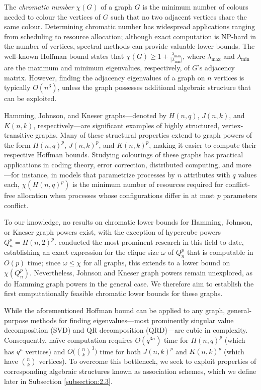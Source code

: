 \documentclass{article}
\numberwithin{equation}{section}
\theoremstyle{plain}
\begin{document}
The \emph{chromatic number} $\chi(G)$ of a graph $G$ is the minimum number of colours needed to colour the vertices of $G$ such that no two adjacent vertices share the same colour. Determining chromatic number has widespread applications ranging from scheduling to resource allocation; although exact computation is NP-hard in the number of vertices, spectral methods can provide valuable lower bounds. The well-known Hoffman bound \cite{Hof03} states that $\chi(G) \ge 1 + \frac{\lambda_{\text{max}}}{\lvert \lambda_{\text{min}} \rvert}$, where $\lambda_{\text{max}}$ and $\lambda_{\text{min}}$ are the maximum and minimum eigenvalues, respectively, of $G$'s adjacency matrix. However, finding the adjacency eigenvalues of a graph on $n$ vertices is typically $O(n^3)$, unless the graph possesses additional algebraic structure that can be exploited.

Hamming, Johnson, and Kneser graphs---denoted by $H(n, q)$, $J(n, k)$, and $K(n, k)$, respectively---are significant examples of highly structured, vertex-transitive graphs. Many of these structural properties extend to graph powers of the form $H(n, q)^p$, $J(n, k)^p$, and $K(n, k)^p$, making it easier to compute their respective Hoffman bounds. Studying colourings of these graphs has practical applications in coding theory, error correction, distributed computing, and more---for instance, in models that parametrize processes by $n$ attributes with $q$ values each, $\chi(H(n, q)^p)$ is the minimum number of resources required for conflict-free allocation when processes whose configurations differ in at most $p$ parameters conflict.

To our knowledge, no results on chromatic lower bounds for Hamming, Johnson, or Kneser graph powers exist, with the exception of hypercube powers $Q_n^p = H(n, 2)^p$. \cite{FFR17} conducted the most prominent research in this field to date, establishing an exact expression for the clique size $\omega$ of $Q_n^p$ that is computable in $O(p)$ time; since $\omega \le \chi$ for all graphs, this extends to a lower bound on $\chi(Q_n^p)$. Nevertheless, Johnson and Kneser graph powers remain unexplored, as do Hamming graph powers in the general case. We therefore aim to establish the first computationally feasible chromatic lower bounds for these graphs.

While the aforementioned Hoffman bound can be applied to any graph, general-purpose methods for finding eigenvalues---most prominently singular value decomposition (SVD) and QR decomposition (QRD)---are cubic in complexity. Consequently, na\"ive computation requires $O(q^{3n})$ time for $H(n, q)^p$ (which has $q^n$ vertices) and $O\bigl(\binom{n}{k}^3\bigr)$ time for both $J(n, k)^p$ and $K(n, k)^p$ (which have $\binom{n}{k}$ vertices). To overcome this bottleneck, we seek to exploit properties of corresponding algebraic structures known as association schemes, which we define later in Subsection \ref{subsection:2.3}.
\end{document}

